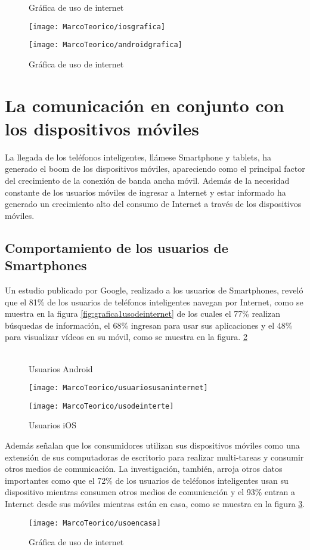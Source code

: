 	\begin{figure}[hbpt!]
		\centering
		\caption{Gráfica de uso de internet}
		\label{fig:graficaiost}
		\texttt{[image: MarcoTeorico/iosgrafica]}
		\caption{Gráfica de uso de internet}
		\label{fig:graficaandroid}
		\texttt{[image: MarcoTeorico/androidgrafica]}
	\end{figure}
	\section{La comunicación en conjunto con los dispositivos móviles}
	La llegada de los teléfonos inteligentes, llámese Smartphone y tablets, ha generado el boom de los dispositivos móviles, apareciendo como el principal factor del crecimiento de la conexión de banda ancha móvil. Además de la necesidad constante de los usuarios móviles de ingresar a Internet y estar informado ha generado un crecimiento alto del consumo de Internet a través de los dispositivos móviles.
	\subsection{Comportamiento de los usuarios de Smartphones}
	Un estudio publicado por Google, realizado a los usuarios de Smartphones, reveló que el 81\% de los usuarios de teléfonos inteligentes navegan por Internet,  como se muestra en la figura \ref{fig:grafica1usodeinternet} de los cuales el 77\% realizan búsquedas de información, el 68\% ingresan para usar sus aplicaciones y el 48\% para visualizar vídeos en su móvil, como se muestra en la figura. \ref{fig:grafica2usodeinternet}\\ \\
	\begin{figure}
		\centering
		\caption{Usuarios Android}
		\label{fig:grafica1usodeinternet}
		\texttt{[image: MarcoTeorico/usuariosusaninternet]}
		\caption{Usuarios iOS}
		\label{fig:grafica2usodeinternet}
		\texttt{[image: MarcoTeorico/usodeinterte]}
	\end{figure}
	Además señalan que los consumidores utilizan sus dispositivos móviles como una extensión de sus computadoras de escritorio para realizar multi-tareas y consumir otros medios de comunicación. La investigación, también, arroja otros datos importantes como que el 72\% de los usuarios de teléfonos inteligentes usan su dispositivo mientras consumen otros medios de comunicación y el 93\% entran a Internet desde sus móviles mientras están en casa, como se muestra en la figura \ref{fig:grafica3usodeinternet}.\\
	\begin{figure}
		\centering
		\caption{Gráfica de uso de internet}
		\label{fig:grafica3usodeinternet}
		\texttt{[image: MarcoTeorico/usoencasa]}
	\end{figure}
	

